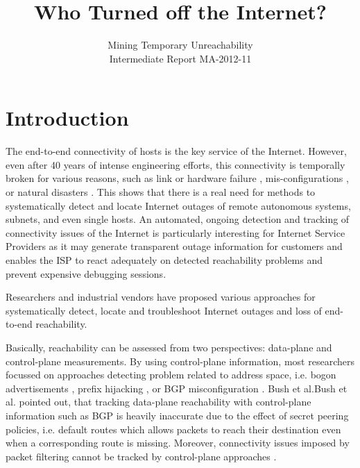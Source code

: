 \documentclass{sigcomm-alternate}
\begin{document}
 
\title{Who Turned off the Internet?} 
\subtitle{Mining Temporary Unreachability\\ \Large Intermediate Report MA-2012-11}

\author{ 
}

\maketitle 
\section{Introduction}
The end-to-end connectivity of hosts is the key service of the Internet.
However, even after 40 years of intense engineering efforts, this
connectivity is temporally broken for various reasons, such as link
or hardware failure \cite{Markopoulou:2008}, mis-configurations
\cite{Mahajan:2002}, or natural disasters
\cite{Dainotti:2012:EBH,Schulman:2011}.
This shows that there is a real need for methods to systematically
detect and locate Internet outages of remote autonomous systems,
subnets, and even single hosts. An automated, ongoing detection and
tracking of connectivity issues of the Internet is particularly
interesting for Internet Service Providers as it may generate
transparent outage information for customers and enables the ISP
to react adequately on detected reachability problems and prevent
expensive debugging sessions.

Researchers and industrial vendors have proposed various approaches
for systematically detect, locate and troubleshoot Internet outages
and loss of end-to-end reachability.

Basically, reachability can be assessed from two perspectives:
data-plane and control-plane measurements. By using control-plane
information, most researchers focussed on approaches detecting
problem related to address space, i.e. bogon advertisements
\cite{Feamster:2005}, prefix hijacking \cite{Zhang:2010},
or BGP misconfiguration \cite{Mahajan:2002}. Bush et
al.Bush et al.\cite{Bush:Optometry} pointed out, that tracking data-plane
reachability with control-plane information such as BGP is heavily
inaccurate due to the effect of secret peering policies, i.e. default
routes which allows packets to reach their destination even when a
corresponding route is missing.
Moreover, connectivity issues imposed by packet filtering cannot
be tracked by control-plane approaches \cite{Dainotti:2011:ACI}.
\end{document}
